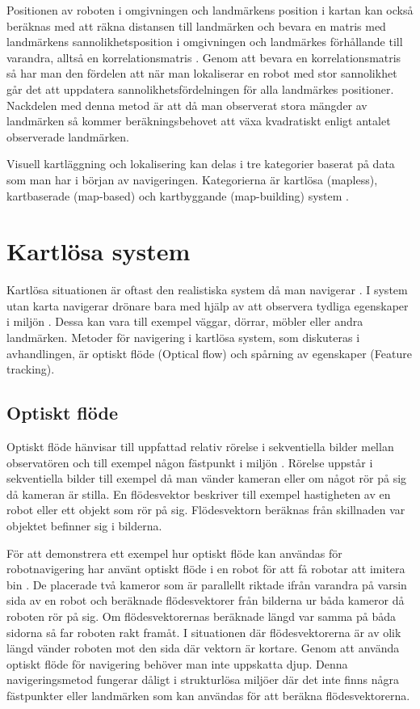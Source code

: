 Positionen av roboten i omgivningen och landmärkens position i kartan kan också beräknas med att räkna distansen till landmärken och bevara en matris med landmärkens sannolikhetsposition i omgivningen och landmärkes förhållande till varandra, alltså en korrelationsmatris \citep{realslamproblem, ProbabilisticRobotics}. Genom att bevara en korrelationsmatris så har man den fördelen att när man lokaliserar en robot med stor sannolikhet går det att uppdatera sannolikhetsfördelningen för alla landmärkes positioner. Nackdelen med denna metod är att då man observerat stora mängder av landmärken så kommer beräkningsbehovet att växa kvadratiskt enligt antalet observerade landmärken. 

Visuell kartläggning och lokalisering kan delas i tre kategorier baserat på data som man har i början av navigeringen. Kategorierna är kartlösa (mapless), kartbaserade (map-based) och kartbyggande (map-building) system \citep{geospatial}. 

\section{Kartlösa system}

Kartlösa situationen är oftast den realistiska system då man navigerar \citep{ProbabilisticRobotics}. I system utan karta navigerar drönare bara med hjälp av att observera tydliga egenskaper i miljön \citep{982903}. Dessa kan vara till exempel väggar, dörrar, möbler eller andra landmärken. Metoder för navigering i kartlösa system, som diskuteras i avhandlingen, är optiskt flöde (Optical flow) och spårning av egenskaper (Feature tracking). 

\subsection{Optiskt flöde}

Optiskt flöde hänvisar till uppfattad relativ rörelse i sekventiella bilder mellan observatören och till exempel någon fästpunkt i miljön \citep{opticalflowuav}. Rörelse uppstår i sekventiella bilder till exempel då man vänder kameran eller om något rör på sig då kameran är stilla. En flödesvektor beskriver till exempel hastigheten av en robot eller ett objekt som rör på sig. Flödesvektorn beräknas från skillnaden var objektet befinner sig i bilderna.

För att demonstrera ett exempel hur optiskt flöde kan användas för robotnavigering har \cite{341094} använt optiskt flöde i en robot för att få robotar att imitera bin \citep{341094}. De placerade två kameror som är parallellt riktade ifrån varandra på varsin sida av en robot och beräknade flödesvektorer från bilderna ur båda kameror då roboten rör på sig. Om flödesvektorernas beräknade längd var samma på båda sidorna så far roboten rakt framåt. I situationen där flödesvektorerna är av olik längd vänder roboten mot den sida där vektorn är kortare. Genom att använda optiskt flöde för navigering behöver man inte uppskatta djup. Denna navigeringsmetod fungerar dåligt i strukturlösa miljöer där det inte finns några fästpunkter eller landmärken som kan användas för att beräkna flödesvektorerna.

